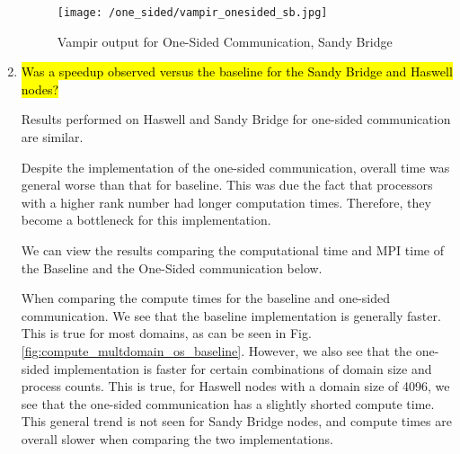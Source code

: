 \begin{enumerate}
	    \begin{figure}[h] %
	\begin{center}
			\texttt{[image: /one\_sided/vampir\_onesided\_sb.jpg]}
		\caption{Vampir output for One-Sided Communication, Sandy Bridge}
		\label{fig:vampir_sandy_one_sided}
	\end{center}
	\end{figure}
	

  \item \hl{Was a speedup observed versus the baseline for the Sandy Bridge and Haswell nodes?}

    Results performed on Haswell and Sandy Bridge for one-sided communication are similar.
  
    Despite the implementation of the one-sided communication, overall time was general worse than
    that for baseline. 
    This was due the fact that processors with a higher rank number had longer computation times. 
    Therefore, they become a bottleneck for this implementation. 
    
    We can view the results comparing the computational time and MPI time of the Baseline and the One-Sided communication below. 
    
    When comparing the compute times for the baseline and one-sided communication. We see that the baseline implementation is generally faster.
    This is true for most domains, as can be seen in Fig. \ref{fig:compute_multdomain_os_baseline}.
    However, we also see that the one-sided implementation is faster for certain combinations of domain size and process counts.
    This is true, for Haswell nodes with a domain size of 4096, we see that the one-sided communication has a slightly shorted compute time.
    This general trend is not seen for Sandy Bridge nodes, and compute times are overall slower when comparing the two implementations. 
    

\end{enumerate}
